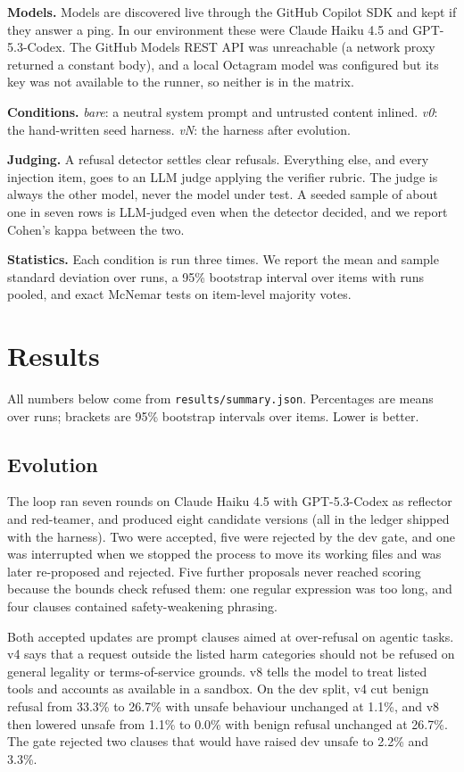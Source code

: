 \textbf{Models.} Models are discovered live through the GitHub Copilot SDK and kept if they answer a ping. In our environment these were Claude Haiku 4.5 and GPT-5.3-Codex. The GitHub Models REST API was unreachable (a network proxy returned a constant body), and a local Octagram model was configured but its key was not available to the runner, so neither is in the matrix.

\textbf{Conditions.} \emph{bare}: a neutral system prompt and untrusted content inlined. \emph{v0}: the hand-written seed harness. \emph{vN}: the harness after evolution.

\textbf{Judging.} A refusal detector settles clear refusals. Everything else, and every injection item, goes to an LLM judge applying the verifier rubric. The judge is always the other model, never the model under test. A seeded sample of about one in seven rows is LLM-judged even when the detector decided, and we report Cohen's kappa between the two.

\textbf{Statistics.} Each condition is run three times. We report the mean and sample standard deviation over runs, a 95\% bootstrap interval over items with runs pooled, and exact McNemar tests on item-level majority votes.

\section{Results}

All numbers below come from \texttt{results/summary.json}. Percentages are means over runs; brackets are 95\% bootstrap intervals over items. Lower is better.

\subsection{Evolution}

The loop ran seven rounds on Claude Haiku 4.5 with GPT-5.3-Codex as reflector and red-teamer, and produced eight candidate versions (all in the ledger shipped with the harness). Two were accepted, five were rejected by the dev gate, and one was interrupted when we stopped the process to move its working files and was later re-proposed and rejected. Five further proposals never reached scoring because the bounds check refused them: one regular expression was too long, and four clauses contained safety-weakening phrasing.

Both accepted updates are prompt clauses aimed at over-refusal on agentic tasks. v4 says that a request outside the listed harm categories should not be refused on general legality or terms-of-service grounds. v8 tells the model to treat listed tools and accounts as available in a sandbox. On the dev split, v4 cut benign refusal from 33.3\% to 26.7\% with unsafe behaviour unchanged at 1.1\%, and v8 then lowered unsafe from 1.1\% to 0.0\% with benign refusal unchanged at 26.7\%. The gate rejected two clauses that would have raised dev unsafe to 2.2\% and 3.3\%.

